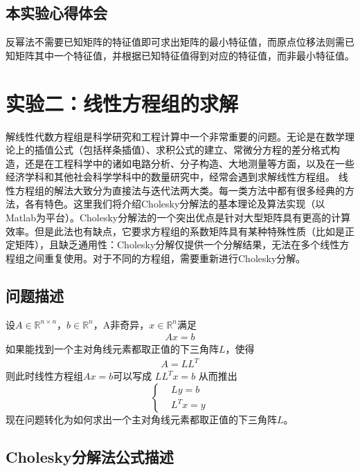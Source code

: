 \documentclass[12pt, a4paper, oneside]{ctexart}
\begin{document}
	
\subsection{本实验心得体会}
反幂法不需要已知矩阵的特征值即可求出矩阵的最小特征值，而原点位移法则需已知矩阵其中一个特征值，并根据已知特征值得到对应的特征值，而非最小特征值。

\section{实验二：线性方程组的求解}
	解线性代数方程组是科学研究和工程计算中一个非常重要的问题。无论是在数学理论上的插值公式（包括样条插值）、求积公式的建立、常微分方程的差分格式构造，还是在工程科学中的诸如电路分析、分子构造、大地测量等方面，以及在一些经济学科和其他社会科学学科中的数量研究中，经常会遇到求解线性方程组。
线性方程组的解法大致分为直接法与迭代法两大类。每一类方法中都有很多经典的方法，各有特色。这里我们将介绍Cholesky分解法的基本理论及算法实现（以Matlab为平台）。Cholesky分解法的一个突出优点是针对大型矩阵具有更高的计算效率。但是此法也有缺点，它要求方程组的系数矩阵具有某种特殊性质（比如是正定矩阵），且缺乏通用性：Cholesky分解仅提供一个分解结果，无法在多个线性方程组之间重复使用。对于不同的方程组，需要重新进行Cholesky分解。
	\subsection{问题描述}
	
	设$A \in \mathbb{R}^{n \times n}$，$b \in \mathbb{R}^{n }$，A非奇异，$x \in \mathbb{R}^{n }$满足 
	\begin{align}
		Ax = b
		\tag{2.1}
	\end{align}
	如果能找到一个主对角线元素都取正值的下三角阵$L$，使得
	\begin{align}
		A = L L^T
		\tag{2.2}
	\end{align}
	则此时线性方程组$Ax = b$可以写成 $L L^T x = b$ 从而推出
		\begin{equation}
			\left\{
			\begin{aligned}
				& L y = b \\
				&L^T x = y
			\end{aligned}
			\right.
			\tag{2.3}
		\end{equation}
	现在问题转化为如何求出一个主对角线元素都取正值的下三角阵$L$。

	\subsection{Cholesky分解法公式描述}
	
\end{document}
